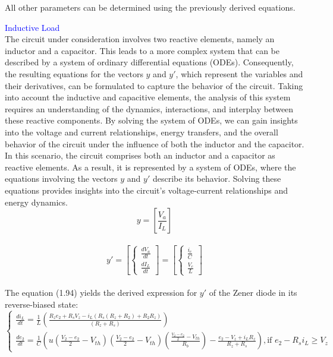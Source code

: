 All other parameters can be determined using the previously derived equations.

\textcolor{blue}{Inductive Load}\\

 The circuit under consideration involves two reactive elements, namely an inductor and a capacitor. This leads to a more complex system that can be described by a system of ordinary differential equations (ODEs). Consequently, the resulting equations for the vectors $y$ and $y'$, which represent the variables and their derivatives, can be formulated to capture the behavior of the circuit. Taking into account the inductive and capacitive elements, the analysis of this system requires an understanding of the dynamics, interactions, and interplay between these reactive components. By solving the system of ODEs, we can gain insights into the voltage and current relationships, energy transfers, and the overall behavior of the circuit under the influence of both the inductor and the capacitor.\\

In this scenario, the circuit comprises both an inductor and a capacitor as reactive elements. As a result, it is represented by a system of ODEs, where the equations involving the vectors $y$ and $y'$ describe its behavior. Solving these equations provides insights into the circuit's voltage-current relationships and energy dynamics.\\

\begin{equation}
    y=[\frac{V_a}{I_L}]
\end{equation}\\

\begin{equation}
    y'=[\begin{cases}
        \frac{dV_a}{dt}\\
        \frac{dI_L}{dt}
    \end{cases}]=[\begin{cases}
        \frac{i_c}{C}\\
        \frac{V_c}{L}
    \end{cases}]
\end{equation}\\

The equation (1.94) yields the derived expression for $y'$ of the Zener diode in its reverse-biased state:\\

\begin{equation}
    \begin{cases}
        \frac{di_L}{dt}=\frac{1}{L}(\frac{R_ze_2+R_sV_z-i_L(R_s(R_z+R_2)+R_2R_z)}{(R_z+R_s)})\\
        \frac{de_2}{dt}=\frac{1}{C}(u(\frac{V_2-e_2}{2}-V_{th})(\frac{V_2-e_2}{2}-V_{th})(\frac{\frac{V_2-e_2}{2}-V_{th}}{R_b})-\frac{e_2-V_z+i_LR_z}{R_z+R_s}),  \text{if } e_2-R_si_L \geq V_z
    \end{cases}
\end{equation}\\

